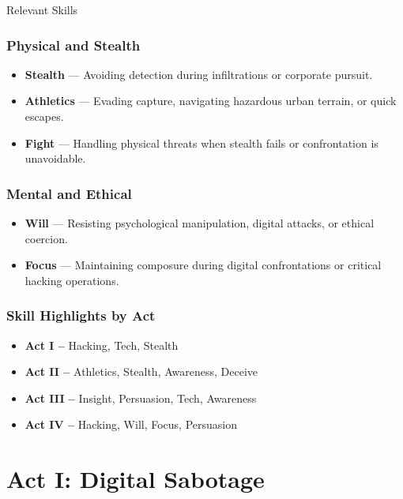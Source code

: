 \documentclass[nodeprecatedcode,bg=print]{dndbook}
\begin{document}
\begin{multicols}{2}
\begin{CommentBox}{Relevant Skills}
    \subsubsection*{Physical and Stealth}
    \begin{itemize}
        \item \textbf{Stealth} — Avoiding detection during infiltrations or corporate pursuit.
        \item \textbf{Athletics} — Evading capture, navigating hazardous urban terrain, or quick escapes.
        \item \textbf{Fight} — Handling physical threats when stealth fails or confrontation is unavoidable.
    \end{itemize}

    \subsubsection*{Mental and Ethical}
    \begin{itemize}
        \item \textbf{Will} — Resisting psychological manipulation, digital attacks, or ethical coercion.
        \item \textbf{Focus} — Maintaining composure during digital confrontations or critical hacking operations.
    \end{itemize}

    \subsubsection*{Skill Highlights by Act}
    \begin{itemize}
        \item \textbf{Act I –} Hacking, Tech, Stealth
        \item \textbf{Act II –} Athletics, Stealth, Awareness, Deceive
        \item \textbf{Act III –} Insight, Persuasion, Tech, Awareness
        \item \textbf{Act IV –} Hacking, Will, Focus, Persuasion
    \end{itemize}    
\end{CommentBox}



\section{Act I: Digital Sabotage}


\end{multicols}
\end{document}
